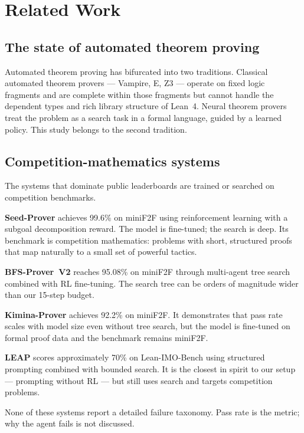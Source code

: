 \chapter{Related Work}
\label{chap:related_work}

\section{The state of automated theorem proving}

Automated theorem proving has bifurcated into two traditions.
Classical automated theorem provers --- Vampire, E, Z3 --- operate on fixed logic fragments
and are complete within those fragments but cannot handle the dependent types and
rich library structure of Lean~4.
Neural theorem provers treat the problem as a search task in a formal language,
guided by a learned policy.
This study belongs to the second tradition.

\section{Competition-mathematics systems}

The systems that dominate public leaderboards are trained or searched on competition benchmarks.

\textbf{Seed-Prover} achieves 99.6\% on miniF2F using reinforcement learning
with a subgoal decomposition reward.
The model is fine-tuned; the search is deep.
Its benchmark is competition mathematics: problems with short, structured proofs
that map naturally to a small set of powerful tactics.

\textbf{BFS-Prover~V2} reaches 95.08\% on miniF2F through
multi-agent tree search combined with RL fine-tuning.
The search tree can be orders of magnitude wider than our 15-step budget.

\textbf{Kimina-Prover} achieves 92.2\% on miniF2F.
It demonstrates that pass rate scales with model size even without tree search,
but the model is fine-tuned on formal proof data and the benchmark remains miniF2F.

\textbf{LEAP} scores approximately 70\% on Lean-IMO-Bench
using structured prompting combined with bounded search.
It is the closest in spirit to our setup --- prompting without RL --- but still
uses search and targets competition problems.

None of these systems report a detailed failure taxonomy.
Pass rate is the metric; why the agent fails is not discussed.

